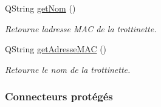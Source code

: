 \begin{DoxyCompactItemize}
Q\+String \hyperlink{class_peripherique_local_af105d458828fbb17e5b556e23d7d7b42}{get\+Nom} ()
\begin{DoxyCompactList}\small\item\em Retourne l\textquotesingle{}adresse M\+AC de la trottinette. \end{DoxyCompactList}\item 
Q\+String \hyperlink{class_peripherique_local_a79ce44141050f589d17f119a3b17444c}{get\+Adresse\+M\+AC} ()
\begin{DoxyCompactList}\small\item\em Retourne le nom de la trottinette. \end{DoxyCompactList}\end{DoxyCompactItemize}
\subsubsection*{Connecteurs protégés}
